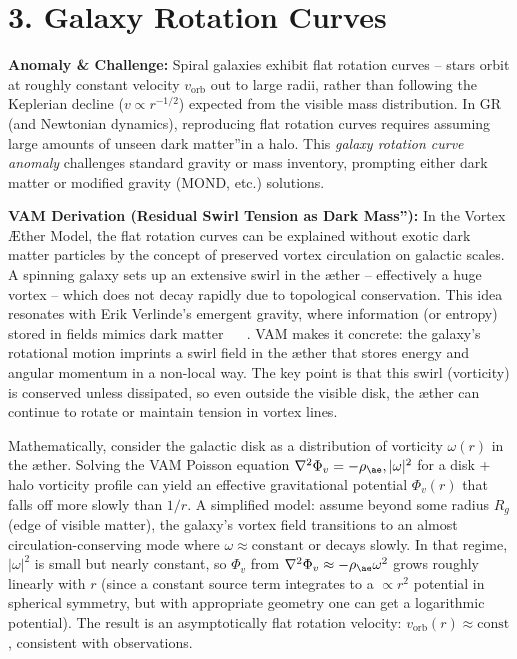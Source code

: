 \documentclass[a4paper, aps,preprint,superscriptaddress, 12pt]{revtex4}
\begin{document}
\section*{3. Galaxy Rotation Curves}

\textbf{Anomaly \& Challenge: } Spiral galaxies exhibit flat rotation curves – stars orbit at roughly constant velocity $v_{\text{orb}}$ out to large radii, rather than following the Keplerian decline ($v \propto r^{-1/2}$) expected from the visible mass distribution. In GR (and Newtonian dynamics), reproducing flat rotation curves requires assuming large amounts of unseen \grqq dark matter\textquotedblright in a halo. This \textit{galaxy rotation curve anomaly} challenges standard gravity or mass inventory, prompting either dark matter or modified gravity (MOND, etc.) solutions.


\textbf{VAM Derivation (Residual Swirl Tension as \grqq Dark Mass\textquotedblright):} In the Vortex Æther Model, the flat rotation curves can be explained without exotic dark matter particles by the concept of preserved vortex circulation on galactic scales. A spinning galaxy sets up an extensive swirl in the æther – effectively a huge vortex – which does not decay rapidly due to topological conservation. This idea resonates with Erik Verlinde's emergent gravity, where information (or entropy) stored in fields mimics dark matter~\cite{Iskandarani2025c} ~\cite{Iskandarani2025c} . VAM makes it concrete: the galaxy's rotational motion imprints a swirl field in the æther that stores energy and angular momentum in a non-local way. The key point is that this swirl (vorticity) is conserved unless dissipated, so even outside the visible disk, the æther can continue to rotate or maintain tension in vortex lines.


Mathematically, consider the galactic disk as a distribution of vorticity $\omega(r)$ in the æther. Solving the VAM Poisson equation $\nabla^2 \Phi_v = -\rho_{\ae},|\omega|^2$ for a disk + halo vorticity profile can yield an effective gravitational potential $\Phi_v(r)$ that falls off more slowly than $1/r$. A simplified model: assume beyond some radius $R_g$ (edge of visible matter), the galaxy's vortex field transitions to an almost circulation-conserving mode where $\omega \approx \text{constant}$ or decays slowly. In that regime, $|\omega|^2$ is small but nearly constant, so $\Phi_v$ from $\nabla^2 \Phi_v \approx -\rho_{\ae}\omega^2$ grows roughly linearly with $r$ (since a constant source term integrates to a $\propto r^2$ potential in spherical symmetry, but with appropriate geometry one can get a logarithmic potential). The result is an asymptotically flat rotation velocity: $v_{\text{orb}}(r) \approx \text{const}$, consistent with observations.
\end{document}
